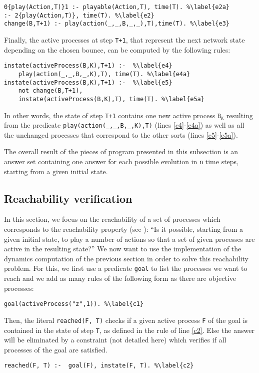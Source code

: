 \begin{lstlisting}
0{play(Action,T)}1 :- playable(Action,T), time(T). %\label{e2a} 
:- 2{play(Action,T)}, time(T). %\label{e2}
change(B,T+1) :- play(action(_,_,B,_,_),T),time(T). %\label{e3}
\end{lstlisting}

Finally, the active processes at step \texttt{T+1},
that represent the next network state depending on the chosen bounce,
can be computed by the following rules:
\begin{lstlisting}
instate(activeProcess(B,K),T+1) :-  %\label{e4}
	play(action(_,_,B,_,K),T), time(T). %\label{e4a}
instate(activeProcess(B,K),T+1) :-  %\label{e5}
	not change(B,T+1),
	instate(activeProcess(B,K),T), time(T). %\label{e5a}
\end{lstlisting}
In other words, the state of step \texttt{T+1} contains one new active process $\texttt{B}_\texttt{K}$
resulting from the predicate \texttt{play(action(\_,\_,B,\_,K),T)} (lines \ref{e4}-\ref{e4a})
as well as all the unchanged processes that correspond to the other sorts (lines \ref{e5}-\ref{e5a}).

The overall result of the pieces of program presented in this subsection
is an answer set containing one answer for each
possible evolution in \texttt{n} time steps,
starting from a given initial state.

\subsection{Reachability verification}
In this section, we focus on the reachability of a set of processes which corresponds to the reachability property (see ):
``Is it possible, starting from a given initial state, to play a number of actions so that a set of given processes are active in the resulting state?''
We now want to use the implementation of the dynamics computation of the previous section in order to solve this reachability problem.
For this, we first use a predicate \texttt{goal} to list the processes we want to reach and we add as many rules of the following form as there are objective processes:
\begin{lstlisting}
goal(activeProcess("z",1)). %\label{c1}
\end{lstlisting}
Then, the literal \texttt{reached(F, T)} 
checks if a given active process \texttt{F} of the goal
is contained in the state of step \texttt{T},
as defined in the rule of line \ref{c2}.
Else the answer will be eliminated by a constraint (not detailed here) which verifies if all processes of the goal are satisfied.
\begin{lstlisting}
reached(F, T) :-  goal(F), instate(F, T). %\label{c2}
\end{lstlisting}

